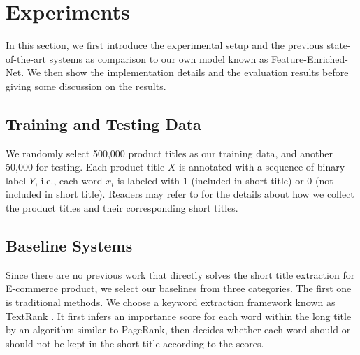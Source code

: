 \section{Experiments}
In this section, we first introduce the experimental setup and the
previous state-of-the-art systems as comparison to 
our own model known as Feature-Enriched-Net.
We then show the implementation details and the evaluation results before
giving some discussion on the results.

\subsection{Training and Testing Data}

We randomly select 500,000 product titles as our training data, 
and another 50,000 for testing.
Each product title $X$ is annotated with a sequence of binary label $Y$,
i.e., each word $x_i$ is labeled with $1$ (included in short title) 
or $0$ (not included in short title). Readers may refer to  
for the details about how we collect the product titles
and their corresponding short titles.

%


\subsection{Baseline Systems}
Since there are no previous work that directly solves the short title 
extraction for E-commerce product, we select our baselines from 
three categories. The first one is traditional methods. 
We choose a keyword extraction framework known as 
TextRank \cite{mihalcea2004textrank}.  It first infers an importance 
score for each word within the long title by an algorithm similar to PageRank, 
then decides whether each word should or should not be kept in the short title 
according to the scores.

